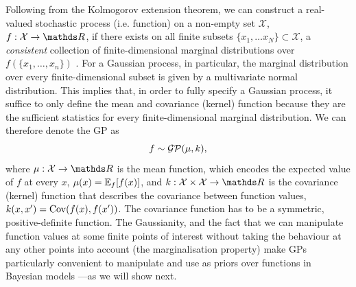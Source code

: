 Following from the Kolmogorov extension theorem, we can construct a real-valued stochastic process (i.e. function) on a non-empty set $\mathcal{X}$, $f: \mathcal{X} \rightarrow \Reals$, if there exists on all finite subsets $\{x_1, \ldots x_N\} \subset \mathcal{X}$, a \emph{consistent} collection of finite-dimensional marginal distributions over $f(\{x_1, \ldots, x_n\})$ \citep{tao2011introduction}. For a Gaussian process, in particular, the marginal distribution over every finite-dimensional subset is given by a multivariate normal distribution. This implies that, in order to fully specify a Gaussian process, it suffice to only define the mean and covariance (kernel) function because they are the sufficient statistics for every finite-dimensional marginal distribution. We can therefore denote the GP as
\begin{equation}
  \label{eq:chapter1:def-gp}
  f \sim \mathcal{GP}(\mu, k),
\end{equation}
where $\mu:\mathcal{X}\rightarrow\Reals$ is the mean function, which encodes the expected value of $f$ at every $x$, $\mu(x) = \Exp{f}{f(x)}$, and $k:\mathcal{X} \times \mathcal{X} \rightarrow \Reals$ is the covariance (kernel) function that describes the covariance between function values, $k(x, x') = \Cov\left(f(x), f(x')\right)$. The covariance function has to be a symmetric, positive-definite function. The Gaussianity, and the fact that we can manipulate function values at some finite points of interest without taking the behaviour at any other points into account (the marginalisation property) make GPs particularly convenient to manipulate and use as priors over functions in Bayesian models ---as we will show next.

